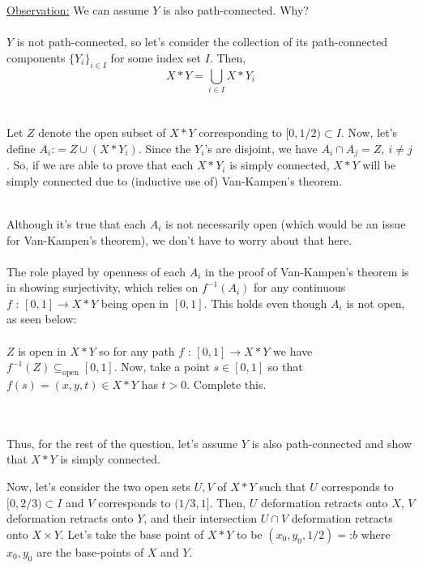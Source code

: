 \documentclass[11pt]{article}
\begin{document}
\begin{dottedbox}
  \underline{Observation:} We can assume $Y$ is also path-connected. Why? 
  \\
  \\
  $Y$ is not path-connected, so let's consider the collection of its path-connected components $\{Y_i\}_{i \in I}$ for some index set $I$. Then, $$ X * Y = \bigcup_{i \in I} X * Y_i $$
  \\
  \\
  Let $Z$ denote the open subset of $X * Y$ corresponding to $[0, 1/2) \subset I$. Now, let's define $A_i \text{:}= Z \cup (X * Y_i) $. Since the $Y_i$'s are disjoint, we have $A_i \cap A_j = Z, ~i \neq j$. So, if we are able to prove that each $X * Y_i$ is simply connected, $X * Y$ will be simply connected due to (inductive use of) Van-Kampen's theorem.
  \\
  \\
  \begin{note}
  {Although it's true that each $A_i$ is not necessarily open (which would be an issue for Van-Kampen's theorem), we don't have to worry about that here.
  \\
  \\
  The role played by openness of each $A_i$ in the proof of Van-Kampen's theorem is in showing surjectivity, which relies on $f^{-1}(A_i)$ for any continuous $f \text{ : } [0, 1] \rightarrow X * Y $ being open in $[0, 1]$. This holds even though $A_i$ is not open, as seen below: 
  \\
  \\
  $Z$ is open in $X*Y$ so for any path $f \text{ : } [0, 1] \rightarrow X * Y$ we have $f^{-1}(Z) \subseteq_{\text{open}} [0, 1]$. Now, take a point $s \in [0, 1]$ so that $f(s) = (x, y, t) \in X * Y$ has $t > 0$. Complete this.
  }
  \end{note}
  \\
  \\
  Thus, for the rest of the question, let's assume $Y$ is also path-connected and show that $X * Y$ is simply connected.
\end{dottedbox} Now, let's consider the two open sets $U, V$ of $X * Y$ such that $U$ corresponds to $[0, 2/3) \subset I$ and $V$ corresponds to $(1/3,1]$. Then, $U$ deformation retracts onto $X$, $V$ deformation retracts onto $Y$, and their intersection $U \cap V$ deformation retracts onto $X \times Y$. Let's take the base point of $X * Y$ to be $(x_0,y_0,1/2) =\text{:} b$ where $x_0,y_0$ are the base-points of $X$ and $Y$.
\\
\end{document}
